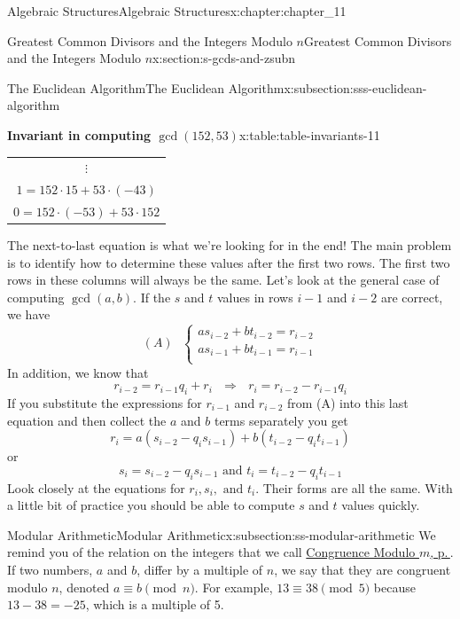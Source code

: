 \documentclass[twoside,10pt,]{book}
\numberwithin{equation}{section}
\begin{document}
\begin{chapterptx}{Algebraic Structures}{}{Algebraic Structures}{}{}{x:chapter:chapter_11}
\begin{sectionptx}{Greatest Common Divisors  and the Integers Modulo \(n\)}{}{Greatest Common Divisors  and the Integers Modulo \(n\)}{}{}{x:section:s-gcds-and-zsubn}
\begin{subsectionptx}{The Euclidean Algorithm}{}{The Euclidean Algorithm}{}{}{x:subsection:sss-euclidean-algorithm}
\begin{tableptx}{\textbf{Invariant in computing \(\gcd(152,53)\)}}{x:table:table-invariants-11}{}
{\begin{tabular}{c}
\(\vdots\)\tabularnewline[0pt]
\(1 = 152\cdot 15 + 53\cdot (-43)\)\tabularnewline[0pt]
\(0 = 152 \cdot (-53) + 53\cdot 152\)
\end{tabular}
}%
\end{tableptx}%
The next-to-last equation is what we're looking for in the end!  The main problem is to identify how to determine these values after the first two rows.  The first two rows in these columns will always be the same. Let's look at the general case of computing \(\gcd(a,b)\).  If the \(s\) and \(t\) values in rows \(i - 1\) and  \(i - 2\) are correct, we have%
\begin{equation*}
(A)\textrm{        }\left\{
\begin{array}{c}
a s_{i-2}+b t_{i-2}=r_{i-2} \\
a s_{i-1}+b t_{i-1}=r_{i-1} \\
\end{array}
\right.
\end{equation*}
In addition, we know that%
\begin{equation*}
r_{i-2}=r_{i-1} q_i+r_i\textrm{    }\Rightarrow \textrm{     }r_i=r_{i-2}-r_{i-1} q_i
\end{equation*}
If you substitute the expressions for \(r_{i-1}\) and \(r_{i-2}\) from (A) into this last equation and then collect the \(a\) and \(b\) terms separately you get%
\begin{equation*}
r_i= a\left(s_{i-2}- q_is_{i-1}\right) + b\left(t_{i-2} - q_it_{i-1}\right)
\end{equation*}
or%
\begin{equation*}
s_{i }=s_{i-2}- q_is_{i-1}\textrm{  and  } t_i= t_{i-2} - q_it_{i-1}
\end{equation*}
Look closely at the equations for \(r_i, s_i, \textrm{ and } t_i\).  Their forms are all the same.  With a little bit of practice you should be able to compute \(s\) and \(t\) values quickly.%
\end{subsectionptx}
%
%
\typeout{************************************************}
\typeout{************************************************}
%
\begin{subsectionptx}{Modular Arithmetic}{}{Modular Arithmetic}{}{}{x:subsection:ss-modular-arithmetic}
%
We remind you of the relation on the integers that we call \hyperref[x:definition:def-congruence-mod-n]{Congruence Modulo \(m\), p.\,\pageref{x:definition:def-congruence-mod-n}}. If two numbers, \(a\) and \(b\), differ by a multiple of \(n\), we say that they are congruent modulo \(n\), denoted \(a \equiv  b\pmod{n}\). For example, \(13 \equiv  38\pmod{5}\) because \(13-38 = -25\), which is a multiple of 5.%

\end{subsectionptx}
\end{sectionptx}
\end{chapterptx}
\end{document}
